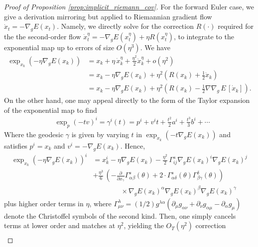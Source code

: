 \documentclass[reqno,11pt,letterpaper]{amsart}
\theoremstyle{plain}
\theoremstyle{definition}
\theoremstyle{remark}
\begin{document}
\begin{proof}[Proof of Proposition \ref{prop:implicit_riemann_cov}]
    For the forward Euler case, we give a derivation mirroring \cite{barrett2021implicit, smith2021on} but applied to Riemannian gradient flow $\dot{x}_{t} = - \nabla_{g} E(x_{t})$. Namely, we directly solve for the correction $R(\cdot)$ required for the the second-order flow $\dot{x}_{t}^{\eta} = - \nabla_{g} E(x_{t}^{\eta}) + \eta R(x_{t}^{\eta})$, to integrate to the exponential map up to errors of size $O(\eta^{3})$. We have
    \begin{align*}
    \exp_{x_{k}}(-\eta \nabla_{g} E(x_{k})) &= x_{k} + \eta \,\dot{x}_{k}^{\eta} + \frac{\eta^{2}}{2} \ddot{x}_{k}^{\eta} + o(\eta^{2}) \\
    &= x_{k} - \eta \nabla_{g} E(x_{k}) + \eta^{2} \left( R(x_{k}) + \frac{1}{2} \ddot{x}_{k} \right) \\
    &=x_{k} - \eta \nabla_{g} E(x_{k}) + \eta^{2} \left( R(x_{k}) - \frac{1}{2} \nabla \nabla_{g} \,E \, [ \dot{x}_{k} ] \right).
    \end{align*}
    On the other hand, one may appeal directly to the form of the Taylor expansion of the exponential map \cite{Monera2013} to find
    \begin{align*}
    &\exp_{p}(-t v)^{i} = \gamma^{i}(t) = p^{i} + v^{i} t + \frac{t^{2}}{2} a^{i} + \frac{t^{3}}{3} b^{i} + \cdots 
    \end{align*}
    Where the geodesic $\gamma$ is given by varying $t$ in  $\exp_{x_{k}}(-t \nabla_{g} E(x_{k}))$ and satisfies $p^{i} = x_{k}$ and $v^{i} = -\nabla_{g} E(x_{k})$. Hence,
    \begin{align*}
    \exp_{x_{k}}(-\eta \nabla_{g}E(x_{k}))^{i} &= x_{k}^{i} - \eta\nabla_{g} E(x_{k}) - \frac{\eta^{2}}{2} \,\Gamma_{ij}^{s} \nabla_{g} E(x_{k})^{i} \nabla_{g} E(x_{k}) ^{j} \\
    &+ \frac{\eta^{3}}{6} \, \left(
    -\frac{\partial}{\partial x_{\gamma}}\Gamma^{s}_{\alpha\beta}(\theta)
    + 2\cdot \Gamma^{s}_{\alpha\delta}(\theta) \Gamma^{\delta}_{
\beta\gamma
    } (\theta)\right)\\
    &\qquad \qquad \times \nabla_{g} E(x_{k})^{\alpha} \nabla_{g} E(x_{k})^{\beta} \nabla_{g} E(x_{k})^{\gamma}
    \end{align*}
    plus higher order terms in $\eta$, where $\Gamma^{\lambda}_{\mu\nu} = (1/2) g^{\lambda\alpha}
    (\partial_{\mu} g_{\alpha\nu} + \partial_{\nu} g_{\alpha \mu} - \partial_{\alpha} g_{\mu})$ denote the Christoffel symbols of the second kind. Then, one simply cancels terms at lower order and matches at $\eta^{2}$, yielding the $O_{T}(\eta^{2})$ correction
    \begin{align*}

\end{align*}
\end{proof}
\end{document}

